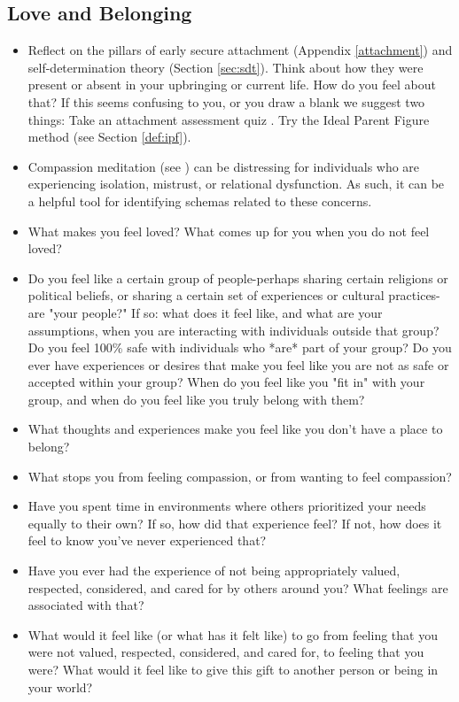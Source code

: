 \documentclass[12pt,letterpaper]{book}
\begin{document}
\subsection*{Love and Belonging}
\begin{itemize}
    \item Reflect on the pillars of early secure attachment (Appendix \ref{attachment}) and self-determination theory (Section \ref{sec:sdt}). Think about how they were present or absent in your upbringing or current life. How do you feel about that? If this seems confusing to you, or you draw a blank we suggest two things: Take an attachment assessment quiz \cite{attachmentProject}. Try the Ideal Parent Figure method (see Section \ref{def:ipf}).
    \item Compassion meditation (see \textcite{lkMeditation}) can be distressing for individuals who are experiencing isolation, mistrust, or relational dysfunction. As such, it can be a helpful tool for identifying schemas related to these concerns.
    \item What makes you feel loved? What comes up for you when you do not feel loved?
    \item Do you feel like a certain group of people-perhaps sharing certain religions or political beliefs, or sharing a certain set of experiences or cultural practices-are "your people?" If so: what does it feel like, and what are your assumptions, when you are interacting with individuals outside that group? Do you feel 100\% safe with individuals who *are* part of your group? Do you ever have experiences or desires that make you feel like you are not as safe or accepted within your group? When do you feel like you "fit in" with your group, and when do you feel like you truly belong with them?
    \item What thoughts and experiences make you feel like you don't have a place to belong?
    \item What stops you from feeling compassion, or from wanting to feel compassion?
    \item Have you spent time in environments where others prioritized your needs equally to their own? If so, how did that experience feel? If not, how does it feel to know you've never experienced that?
    \item Have you ever had the experience of not being appropriately valued, respected, considered, and cared for by others around you? What feelings are associated with that?
    \item What would it feel like (or what has it felt like) to go from feeling that you were not valued, respected, considered, and cared for, to feeling that you were? What would it feel like to give this gift to another person or being in your world?

\end{itemize}
\end{document}
